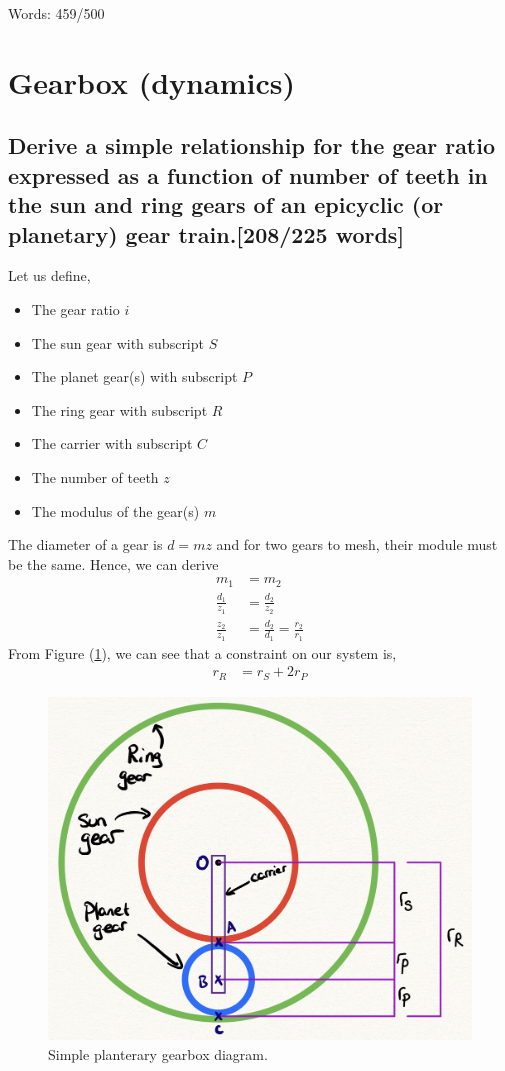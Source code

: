 \documentclass[12pt]{article}
\numberwithin{equation}{section}
\begin{document}
\begin{flushleft}
Words: 459/500

\section{Gearbox (dynamics)}
\subsection[Gear ratio derivation.]{Derive a simple relationship for the gear ratio expressed as a function of number of teeth in the sun and ring gears of an epicyclic (or planetary) gear train.[208/225 words]}
Let us define,
\begin{multicols}{2}
  \begin{itemize} 
    \item The gear ratio $i$
    \item The sun gear with subscript $S$
    \item The planet gear(s) with subscript $P$ 
    \item The ring gear with subscript $R$
    \item The carrier with subscript $C$
    \item The number of teeth $z$
    \item The modulus of the gear(s) $m$
  \end{itemize}
\end{multicols}
The diameter of a gear is $d = mz$ and for two gears to mesh, their module must be the same. Hence, we can derive
\begin{align}
  m_1 &= m_2\\
  \frac{d_1}{z_1} &= \frac{d_2}{z_2}\\
  \frac{z_2}{z_1} &= \frac{d_2}{d_1} = \frac{r_2}{r_1}
\end{align}
From Figure (\ref{SystemRadii}), we can see that a constraint on our system is,
\begin{align}
  r_R &= r_S + 2r_P
  \label{radiiRelationship}
\end{align}
\begin{figure}[H]
  \centering
  \includegraphics[width = 0.7 \textwidth]{./img/GearRadii.png}
  \caption{Simple planterary gearbox diagram.}
  \label{SystemRadii}
\end{figure}


\end{flushleft}
\end{document}
